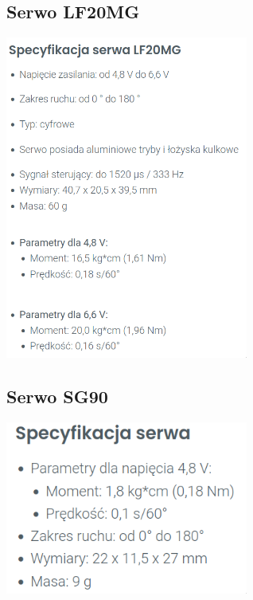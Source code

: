 \documentclass[a4paper,12pt, openany]{article}
\begin{document}
\subsection{Serwo LF20MG}
\includegraphics[width=0.6\textwidth]{serwolf.png}

\subsection{Serwo SG90}
\includegraphics[width=0.6\textwidth]{serwosg.png}



\end{document}
